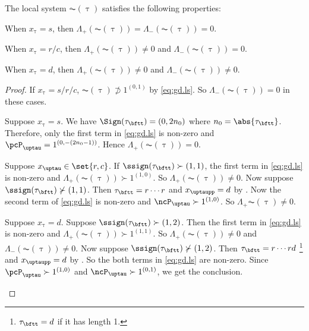 \documentclass[ssunip]{subfiles}
\begin{document}
\begin{lem}
  The local system $\AC( \uptau )$ satisfies the following properties:
  \begin{enumT}
    \item When $x_{\uptau} = s$, then $\Lambda_+(\AC(\uptau)) = \Lambda_{-}(\AC(\uptau)) = 0$.
    \item When $x_{\uptau} = r/c$, then $\Lambda_+(\AC(\uptau)) \neq 0$ and $\Lambda_{-}(\AC(\uptau))=0$.
    \item When $x_{\uptau} = d$, then $\Lambda_+(\AC(\uptau))\neq 0$ and $\Lambda_{-}(\AC(\uptau))\neq 0$.
  \end{enumT}
\end{lem}
\begin{proof}
  If $x_{\uptau}=s/r/c$, %
  $\AC(\uptau)\nsupset 1^{(0,1)}$
  by \eqref{eq:gd.ls}. So $\Lambda_{-}(\AC(\uptau))=0$ in these cases.

  \begin{enumPF}
    \item  Suppose $x_{\uptau}=s$. We have $\Sign(\tau_{\bftt})=(0,2n_{0})$
    where $n_{0}= \abs{\tau_{\bftt}}$.
    Therefore, only the first term in  \eqref{eq:gd.ls} is non-zero and
    $\pcP_{\uptau} = 1^{(0,-(2n_{0}-1))}$. Hence $\Lambda_{+}(\AC(\uptau)) =0$.
    \item Suppose $x_{\uptau} \in \set{r,c}$. If $\ssign(\tau_{\bftt})\succ(1,1)$, the
    first term in \eqref{eq:gd.ls} is non-zero and $\Lambda_+(\AC(\uptau))\succ 1^{(1,0)}$.
    So $\Lambda_+(\AC(\uptau))\neq 0$.
    Now suppose $\ssign(\tau_{\bftt})\nsucc (1,1)$. Then
    $\tau_{\bftt}= r\cdots r$ and $x_{\uptaupp}=d$ by .
    Now the second term of \eqref{eq:gd.ls} is non-zero and
    $\ncP_{\uptau}\succ  1^{(1,0)}$. So $\Lambda_{+}\AC(\uptau)\neq 0$.
    \item Suppose $x_{\uptau}=d$. Suppose $\ssign(\tau_{\bftt})\succ (1,2)$.
    Then the first term in \eqref{eq:gd.ls} is non-zero and
    $\Lambda_+(\AC(\uptau))\succ 1^{(1,1)}$. So $\Lambda_+(\AC(\uptau))\neq 0$ and
    $\Lambda_-(\AC(\uptau))\neq 0$.
    Now suppose $\ssign(\tau_{\bftt})\nsucc(1,2)$. Then
    $\tau_{\bftt} = r\cdots rd$
    \footnote{$\tau_{\bftt}=d$ if it has length 1.} and
    $x_{\uptaupp}=d$ by .
    So the both terms in \eqref{eq:gd.ls} are non-zero. Since
    $\pcP_{\uptau}\succ 1^{(1,0)}$  and
    $\ncP_{\uptau}\succ 1^{(0,1)}$, we get the conclusion.
  \end{enumPF}
\end{proof}
\end{document}

